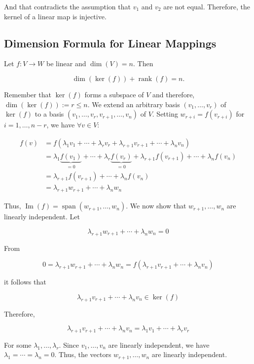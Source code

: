 And that contradicts the assumption that \(v_1\) and \(v_2\) are not equal. Therefore, the 
kernel of a linear map is injective.

\subsection{Dimension Formula for Linear Mappings}

Let \(f: V \to W\) be linear and \(\dim(V) = n\). Then
    
\[
    \dim(\ker(f)) + \operatorname{rank}(f) = n.
\]
    
Remember that \(\ker(f)\) forms a subspace of \(V\) and therefore, \(\dim(\ker(f)) := r \leq n\). We extend an arbitrary basis \((v_1, \ldots, v_r)\) of \(\ker(f)\) to a basis \((v_1, \ldots, v_r, v_{r+1}, \ldots, v_n)\) of \(V\). Setting \(w_{r+i} = f(v_{r+i})\) for \(i = 1, \ldots, n - r\), we have \(\forall v \in V\):

\begin{align*}
    f(v) &= f(\lambda_1v_1 + \cdots + \lambda_r v_r + \lambda_{r+1}v_{r+1} + \cdots + \lambda_n v_n) \\
    &= \lambda_1 \underbrace{f(v_1)}_{=0} + \cdots + \lambda_r \underbrace{f(v_r)}_{=0} + \lambda_{r+1} f(v_{r+1}) + \cdots + \lambda_n f(v_n) \\
    &= \lambda_{r+1} f(v_{r+1}) + \cdots + \lambda_n f(v_n) \\
    &= \lambda_{r+1}w_{r+1} + \cdots + \lambda_n w_n
\end{align*}
    
Thus, \(\operatorname{Im}(f) = \operatorname{span}(w_{r+1}, \ldots, w_n)\). We now show that \(w_{r+1}, \ldots, w_n\) are linearly independent. Let 
    
\[
    \lambda_{r+1}w_{r+1} + \cdots + \lambda_n w_n = 0
\]
    
From

\[
    0 = \lambda_{r+1}w_{r+1} + \cdots + \lambda_n w_n = f(\lambda_{r+1}v_{r+1} + \cdots + \lambda_n v_n)
\]
    
it follows that

\[
    \lambda_{r+1}v_{r+1} + \cdots + \lambda_n v_n \in \ker(f)
\]
    
Therefore,
    
\[
    \lambda_{r+1}v_{r+1} + \cdots + \lambda_n v_n = \lambda_1v_1 + \cdots + \lambda_r v_r
\]

For some \(\lambda_1, \ldots, \lambda_r\). Since \(v_1, \ldots, v_n\) are linearly independent, 
we have \(\lambda_1 = \cdots = \lambda_n = 0\). Thus, the vectors \(w_{r+1}, \ldots, w_n\) are linearly 
independent.
    
